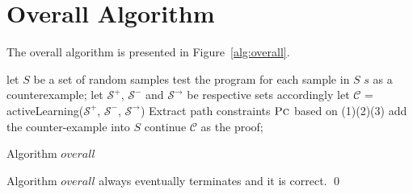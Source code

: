 \section {Overall Algorithm}
\label{sec:overall}
The overall algorithm is presented in Figure~\ref{alg:overall}.
\begin{algorithm}[!h]
\SetAlgoVlined
\Indm
{}
\Indp
let $S$ be a set of random samples\;
 {
    test the program for each sample in $S$\;
     {
        \Return $s$ as a counterexample;
    }
    let $\mathcal{S}^+$, $\mathcal{S}^-$ and $\mathcal{S}^\rightarrow$ be respective sets accordingly\;
    let $\mathcal{C}$ = activeLearning($\mathcal{S}^+$, $\mathcal{S}^-$, $\mathcal{S}^\rightarrow$)\;
    Extract path constraints $\textsc{Pc}$ based on (1)(2)(3)\;
     {
         {
            add the counter-example into $S$\;
            continue\;
        }
    }
    \Return $\mathcal{C}$ as the proof;
}
\caption{Algorithm $overall$}
\label{alg:overall}
\end{algorithm}





\begin{theorem}
Algorithm $overall$ always eventually terminates and it is correct. \hfill \qed
\end{theorem}


